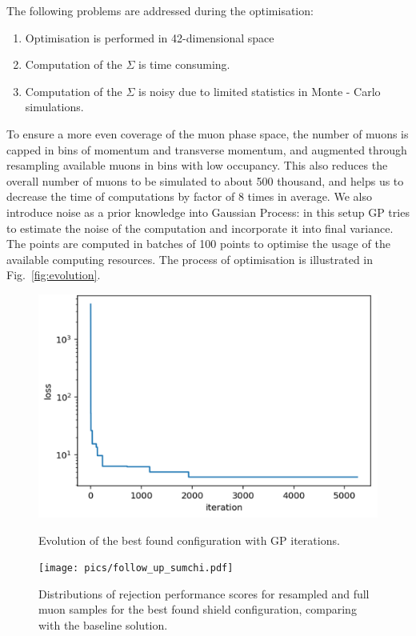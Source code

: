 \documentclass[a4paper]{jpconf}
\theoremstyle{my_theorem_style}
\numberwithin{equation}{section}
\begin{document}
The following problems are addressed during the optimisation:
\begin{enumerate}
\item Optimisation is performed in 42-dimensional space
\item Computation of the $\Sigma$ is time consuming.
\item Computation of the $\Sigma$ is noisy due to limited statistics
  in Monte - Carlo simulations.
\end{enumerate}

To ensure a more even coverage of the muon phase space, the number of
muons is capped in bins of momentum and transverse momentum, and
augmented through resampling available muons in bins with low
occupancy. This also reduces the overall number of muons to be
simulated to about 500 thousand, and helps us to decrease the time of
computations by factor of  8 times in average. We also introduce noise
as a prior knowledge into Gaussian Process: in this setup GP tries to
estimate the noise of the computation and incorporate it into final
variance. The points are computed in batches of 100 points to optimise
the usage of the available computing resources. The process of
optimisation is illustrated in Fig.~\ref{fig:evolution}.

\begin{figure}[tbh]
\centering
\begin{minipage}[c]{0.45\textwidth}
\includegraphics[width=0.9\linewidth]{pics/opt}
 \caption{\label{fig:evolution}Evolution of the best found
   configuration with GP iterations.}
 \end{minipage}
\begin{minipage}[c]{0.45\textwidth}
  \texttt{[image: pics/follow\_up\_sumchi.pdf]}
  \caption{\label{fig:scores} Distributions of rejection performance
    scores for resampled and full muon samples for the best found
    shield configuration, comparing with the baseline solution.}
\end{minipage}  
\end{figure}
\end{document}
